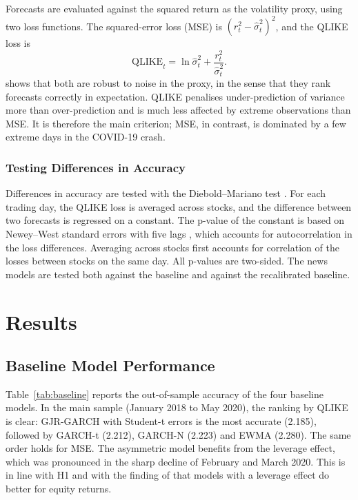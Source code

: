 \documentclass[12pt,a4paper]{article}
\begin{document}
Forecasts are evaluated against the squared return as the volatility proxy, using two loss functions. The squared-error loss (MSE) is $(r_t^2 - \hat\sigma_t^2)^2$, and the QLIKE loss \parencite{patton2011} is
\begin{equation}
  \text{QLIKE}_t = \ln \hat\sigma_t^2 + \frac{r_t^2}{\hat\sigma_t^2}.
  \label{eq:qlike}
\end{equation}
\textcite{patton2011} shows that both are robust to noise in the proxy, in the sense that they rank forecasts correctly in expectation. QLIKE penalises under-prediction of variance more than over-prediction and is much less affected by extreme observations than MSE. It is therefore the main criterion; MSE, in contrast, is dominated by a few extreme days in the COVID-19 crash.

\subsubsection{Testing Differences in Accuracy}\label{sec:method-dm}
Differences in accuracy are tested with the Diebold--Mariano test \parencite{diebold1995}. For each trading day, the QLIKE loss is averaged across stocks, and the difference between two forecasts is regressed on a constant. The p-value of the constant is based on Newey--West standard errors with five lags \parencite{newey1987}, which accounts for autocorrelation in the loss differences. Averaging across stocks first accounts for correlation of the losses between stocks on the same day. All p-values are two-sided. The news models are tested both against the baseline and against the recalibrated baseline.

\section{Results}\label{sec:results}

\subsection{Baseline Model Performance}\label{sec:results-baseline}
Table~\ref{tab:baseline} reports the out-of-sample accuracy of the four baseline models. In the main sample (January 2018 to May 2020), the ranking by QLIKE is clear: GJR-GARCH with Student-t errors is the most accurate (2.185), followed by GARCH-t (2.212), GARCH-N (2.223) and EWMA (2.280). The same order holds for MSE. The asymmetric model benefits from the leverage effect, which was pronounced in the sharp decline of February and March 2020. This is in line with H1 and with the finding of \textcite{hansen2005} that models with a leverage effect do better for equity returns.
\end{document}
